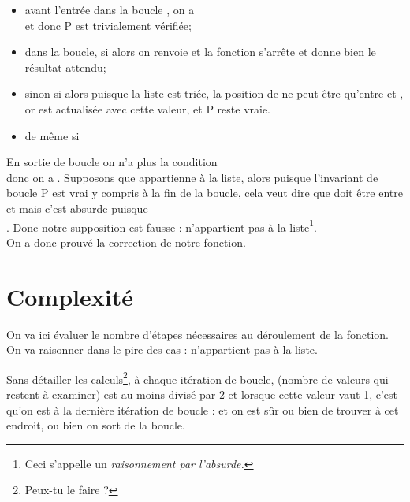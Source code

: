 \begin{itemize}
    \item   avant l'entrée dans la boucle , on a\\
      et  donc P est trivialement vérifiée;
    \item   dans la boucle, si   alors on renvoie  et la fonction s'arrête et donne bien le résultat attendu;
    \item   sinon si  alors puisque la liste est triée, la position de  ne peut être qu'entre  et , or  est actualisée avec cette valeur, et P reste vraie.
    \item   de même si 
\end{itemize}
En sortie de boucle on n'a plus la condition \\
 donc on a . Supposons que  appartienne à la liste, alors puisque l'invariant de boucle P est vrai y compris à la fin de la boucle, cela veut dire que  doit être entre  et  mais c'est absurde puisque\\  . Donc notre supposition est fausse :  n'appartient pas à la liste\footnote{Ceci s'appelle un \textit{raisonnement par l'absurde.}}.\\

On a donc prouvé la correction de notre fonction.

\section{Complexité}

On va ici évaluer le nombre d'étapes nécessaires au déroulement de la fonction. On va raisonner dans le pire des cas :  n'appartient pas à la liste.

Sans détailler les calculs\footnote{Peux-tu le faire ?}, à chaque itération de boucle,  (nombre de valeurs qui restent à examiner) est au moins divisé par 2 et lorsque  cette valeur vaut 1, c'est qu'on est à la dernière itération de boucle :  et on est sûr ou bien de trouver  à cet endroit, ou bien on sort de la boucle.\\

